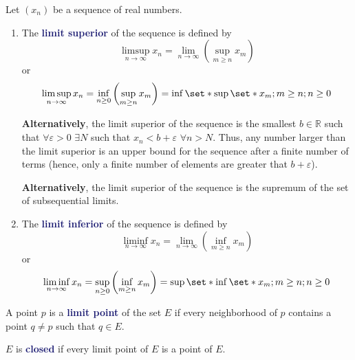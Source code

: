 \documentclass[11pt]{article}
\numberwithin{equation}{section}
\newcommand{\navy}[1]{\textcolor{MidnightBlue}{\bf #1}}
\theoremstyle{definition}
\theoremstyle{definition}
\newcommand\parens[1]{\left( #1 \right)}
\def\Set{\set*}%
\newcommand{\1}{\mathbbm 1}
\newcommand{\e}{\varepsilon}
\newcommand{\RR}{\mathbb R}
\begin{document}
\begin{definition}
Let $\parens{x_n}$ be a sequence of real numbers.

\begin{enumerate}
\item The \navy{limit superior} of the sequence is defined by
\begin{equation}
\limsup\limits_{n \to \infty} x_n = \lim_{n \to \infty}\parens{\sup_{m \geq n} x_m}
\end{equation}
or
\begin{equation}
\limsup\limits_{n \to \infty} x_n = \inf_{n \geq 0} \parens{\sup_{m \geq n} x_m} = \inf\Set{\sup \Set{x_m; m \geq n}; n \geq 0}
\end{equation}

\textbf{Alternatively}, the limit superior of the sequence is the smallest $b \in \RR$ such that $\forall \e > 0$ $\exists N$ such that $x_n < b + \e$ $\forall n > N$. Thus, any number larger than the limit superior is an upper bound for the sequence after a finite number of terms (hence, only a finite number of elements are greater that $b + \e$).

\textbf{Alternatively}, the limit superior of the sequence is the supremum of the set of subsequential limits.

\item The \navy{limit inferior} of the sequence is defined by
\begin{equation}
\liminf\limits_{n \to \infty} x_n = \lim_{n \to \infty}\parens{\inf_{m \geq n} x_m}
\end{equation}
or
\begin{equation}
\liminf\limits_{n \to \infty} x_n = \sup_{n \geq 0} \parens{\inf_{m \geq n} x_m} = \sup\Set{\inf \Set{x_m; m \geq n}; n \geq 0}
\end{equation}
\end{enumerate}

\end{definition}

\begin{definition}
A point $p$ is a \navy{limit point} of the set $E$ if every neighborhood of $p$ contains a point $q \neq p$ such that $q \in E$.
\end{definition}

\begin{definition}[Closed]
$E$ is \navy{closed} if every limit point of $E$ is a point of $E$.
\end{definition}
\end{document}
